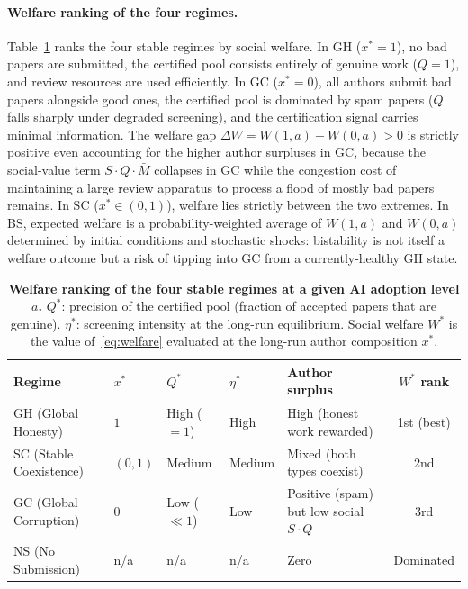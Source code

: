 \documentclass{article}
\begin{document}
\paragraph{Welfare ranking of the four regimes.}
Table~\ref{tab:welfare_regimes} ranks the four stable regimes by social welfare.
In GH ($x^* = 1$), no bad papers are submitted, the certified pool consists entirely of genuine work ($Q = 1$), and review resources are used efficiently.
In GC ($x^* = 0$), all authors submit bad papers alongside good ones, the certified pool is dominated by spam papers ($Q$ falls sharply under degraded screening), and the certification signal carries minimal information.
The welfare gap $\Delta W = W(1,a) - W(0,a) > 0$ is strictly positive even accounting for the higher author surpluses in GC, because the social-value term $S \cdot Q \cdot \bar{M}$ collapses in GC while the congestion cost of maintaining a large review apparatus to process a flood of mostly bad papers remains.
In SC ($x^* \in (0,1)$), welfare lies strictly between the two extremes.
In BS, expected welfare is a probability-weighted average of $W(1,a)$ and $W(0,a)$ determined by initial conditions and stochastic shocks: bistability is not itself a welfare outcome but a risk of tipping into GC from a currently-healthy GH state.

\begin{table}[H]
  \centering
  \footnotesize
  \caption{\textbf{Welfare ranking of the four stable regimes at a given AI adoption level $a$.}
    $Q^*$: precision of the certified pool (fraction of accepted papers that are genuine).
    $\eta^*$: screening intensity at the long-run equilibrium.
    Social welfare $W^*$ is the value of~\eqref{eq:welfare} evaluated at the long-run author composition $x^*$.}
  \label{tab:welfare_regimes}
  \setlength{\tabcolsep}{6pt}
  \begin{tabular}{lllllc}
    \toprule
    Regime & $x^*$ & $Q^*$ & $\eta^*$ & Author surplus & $W^*$ rank \\
    \midrule
    GH (Global Honesty)      & $1$          & High ($= 1$)          & High        & High (honest work rewarded)       & 1st (best)  \\
    SC (Stable Coexistence)  & $(0,1)$      & Medium                & Medium      & Mixed (both types coexist)        & 2nd         \\
    GC (Global Corruption)   & $0$          & Low ($\ll 1$)         & Low         & Positive (spam) but low social $S\cdot Q$ & 3rd  \\
    NS (No Submission)       & n/a          & n/a                   & n/a         & Zero                              & Dominated   \\
    \bottomrule
  \end{tabular}
\end{table}
\end{document}
